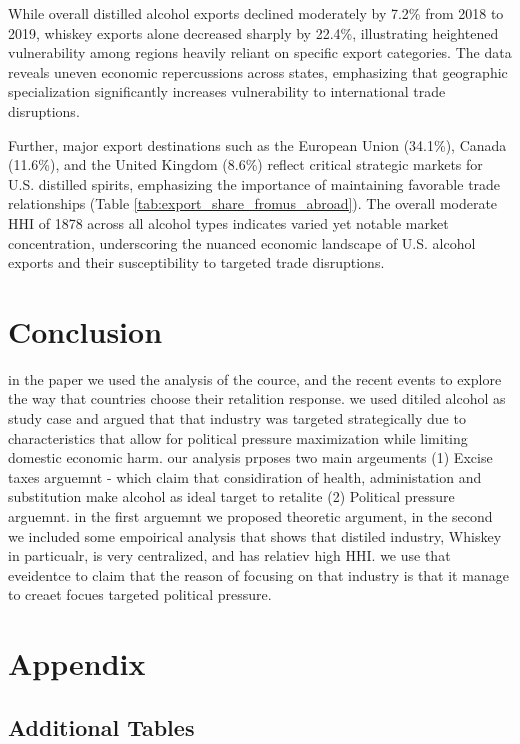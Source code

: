 \documentclass[AEJ]{AEA}
\begin{document}
While overall distilled alcohol exports declined moderately by 7.2\% from 2018 to 2019, whiskey exports alone decreased sharply by 22.4\%, illustrating heightened vulnerability among regions heavily reliant on specific export categories. The data reveals uneven economic repercussions across states, emphasizing that geographic specialization significantly increases vulnerability to international trade disruptions.


Further, major export destinations such as the European Union (34.1\%), Canada (11.6\%), and the United Kingdom (8.6\%) reflect critical strategic markets for U.S. distilled spirits, emphasizing the importance of maintaining favorable trade relationships (Table \ref{tab:export_share_fromus_abroad}). The overall moderate HHI of 1878 across all alcohol types indicates varied yet notable market concentration, underscoring the nuanced economic landscape of U.S. alcohol exports and their susceptibility to targeted trade disruptions.


    
\section{Conclusion}
	in the paper we used the analysis of the cource, and the recent events to explore the way that countries choose their retalition response. we used ditiled alcohol as study case and argued that that industry was targeted strategically due to characteristics that allow for political pressure maximization while limiting domestic economic harm. our analysis prposes two main argeuments (1) Excise taxes arguemnt - which claim that considiration of health, administation and substitution make alcohol as ideal target to retalite (2) Political pressure arguemnt.  in the first arguemnt we proposed theoretic argument, in the second we included some empoirical analysis that shows that distiled industry, Whiskey in particualr, is very centralized, and has relatiev high HHI. we use that eveidentce to claim that the reason of focusing on that industry is that it manage to creaet focues targeted political pressure.
	
	
	
\newpage	
	\section{Appendix}
\subsection{Additional Tables}	
\end{document}

